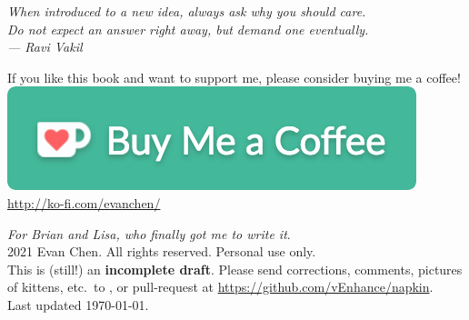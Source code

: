 \begin{titlepage}
	\vspace*{3cm}
	\begin{flushright}
		\large\itshape
		When introduced to a new idea, always ask why you should care. \\[0.2cm]
		Do not expect an answer right away, but demand one eventually. \\[0.8cm]
		--- Ravi Vakil \cite{ref:vakil}
	\end{flushright}

	\vspace*{8em}
	\hrulebar

	\begin{center}
	\begin{minipage}{50ex}
		\centering
		If you like this book and want to support me,
		please consider buying me a coffee! \\[2ex]
		\href{http://ko-fi.com/evanchen}{\includegraphics[width=32ex]{media/kofi4.png}} \\
		\url{http://ko-fi.com/evanchen/}
	\end{minipage}
	\end{center}
	
	\vfill
	{
	\small
	\noindent \emph{For Brian and Lisa, who finally got me to write it}. \\[0.4cm]
	\noindent {\copyright} 2021 Evan Chen.
	All rights reserved. Personal use only. \\
	This is (still!) an \textbf{incomplete draft}.
	Please send corrections, comments, pictures of kittens,
	etc.\ to ,
	or pull-request at \url{https://github.com/vEnhance/napkin}.
	\\[0.4cm]
	\noindent Last updated \today.
	\vspace*{1cm}
	}
\end{titlepage}
